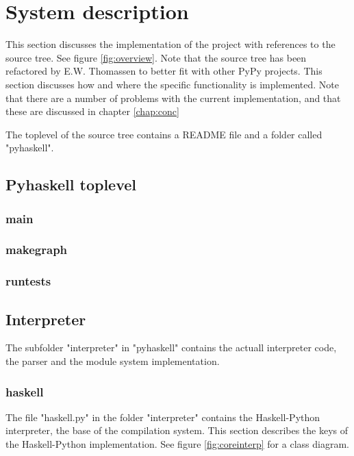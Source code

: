 

\chapter{System description}

This section discusses the implementation of the project with
references to the source tree. See figure \ref{fig:overview}.
Note that the source tree has been refactored by E.W. Thomassen
to better fit with other PyPy projects. This section discusses how
and where the specific functionality is implemented. Note that there
are a number of problems with the current implementation, and that
these are discussed in chapter \ref{chap:conc}

The toplevel of the source tree contains a README file and a folder
called "pyhaskell".

\section{Pyhaskell toplevel}

\subsection{main}

\subsection{makegraph}

\subsection{runtests}

\section{Interpreter}

The subfolder "interpreter" in "pyhaskell" contains the actuall 
interpreter code, the parser and the module system implementation.

\subsection{haskell}

The file "haskell.py" in the folder "interpreter" contains the
Haskell-Python interpreter, the base of the compilation system.
This section describes the keys of the Haskell-Python implementation.
See figure \ref{fig:coreinterp} for a class diagram.

